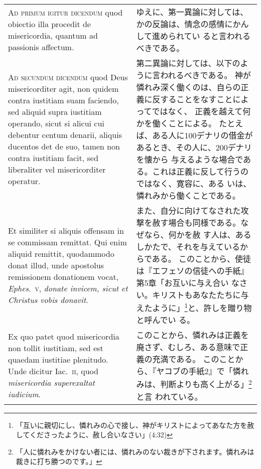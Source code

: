 \documentclass[10pt]{jsarticle} %
\begin{document}
{\begin{longtable}{p{21em}p{21em}}
\\


{\scshape Ad primum igitur dicendum} quod obiectio illa
procedit de misericordia, quantum ad passionis affectum.

&

ゆえに、第一異論に対しては、かの反論は、情念の感情にかんして進められてい
 ると言われるべきである。


\\


{\scshape Ad secundum dicendum} quod Deus misericorditer
agit, non quidem contra iustitiam suam faciendo, sed aliquid supra
iustitiam operando, sicut si alicui cui debentur centum denarii, aliquis
ducentos det de suo, tamen non contra iustitiam facit, sed liberaliter
vel misericorditer operatur. 
&


第二異論に対しては、以下のように言われるべきである。
神が憐れみ深く働くのは、自らの正義に反することをなすことによってではなく、
 正義を越えて何かを働くことによる。
たとえば、ある人に100デナリの借金があるとき、その人に、200デナリを懐から
 与えるような場合である。これは正義に反して行うのではなく、寛容に、ある
 いは、憐れみから働くことである。

\\


Et similiter si aliquis offensam in se
commissam remittat. 
Qui enim aliquid remittit, quodammodo donat illud,
unde apostolus remissionem donationem vocat, {\itshape Ephes}.~{\scshape v}, {\itshape donate invicem,
sicut et Christus vobis donavit}.


&

また、自分に向けてなされた攻撃を赦す場合も同様である。なぜなら、何かを赦
 す人は、あるしかたで、それを与えているからである。
このことから、使徒は『エフェソの信徒への手紙』第5章「お互いに与え合い
 なさい。キリストもあなたたちに与えたように」\footnote{「互いに親切にし、憐れみの心で接し、神がキリストによってあなた方を赦してくださったように、赦し合いなさい」(4:32)}と、許しを贈り物と呼んでい
 る。



\\

 Ex quo patet quod misericordia non
tollit iustitiam, sed est quaedam iustitiae plenitudo. Unde dicitur
Iac.~{\scshape ii}, quod {\itshape misericordia superexaltat iudicium}.


&


このことから、憐れみは正義を廃さず、むしろ、ある意味で正義の充満である。
 このことから、『ヤコブの手紙2』で「憐れみは、判断よりも高く上がる」\footnote{「人に憐れみをかけない者には、憐れみのない裁きが下されます。憐れみは裁きに打ち勝つのです。」}と言
 われている。




\end{longtable}}
\end{document}
